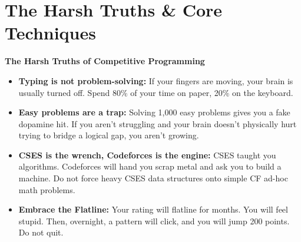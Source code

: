 \documentclass[12pt, a4paper]{article}
\begin{document}
\thispagestyle{plain}
{\hypersetup{linkcolor=primary}
\tableofcontents}
\newpage

\section{The Harsh Truths \& Core Techniques}

\noindent\textbf{The Harsh Truths of Competitive Programming}
\begin{sidebar}
\begin{itemize}[leftmargin=1.5em, itemsep=5pt]

  \item \textbf{Typing is not problem-solving:} If your fingers are moving, your
        brain is usually turned off. Spend 80\% of your time on paper, 20\% on
        the keyboard.

  \item \textbf{Easy problems are a trap:} Solving 1{,}000 easy problems gives
        you a fake dopamine hit. If you aren't struggling and your brain doesn't
        physically hurt trying to bridge a logical gap, you aren't growing.

  \item \textbf{CSES is the wrench, Codeforces is the engine:} CSES taught you
        algorithms. Codeforces will hand you scrap metal and ask you to build a
        machine. Do not force heavy CSES data structures onto simple CF
        ad-hoc math problems.

  \item \textbf{Embrace the Flatline:} Your rating will flatline for months.
        You will feel stupid. Then, overnight, a pattern will click, and you
        will jump 200 points. Do not quit.

\end{itemize}
\end{sidebar}
\end{document}
